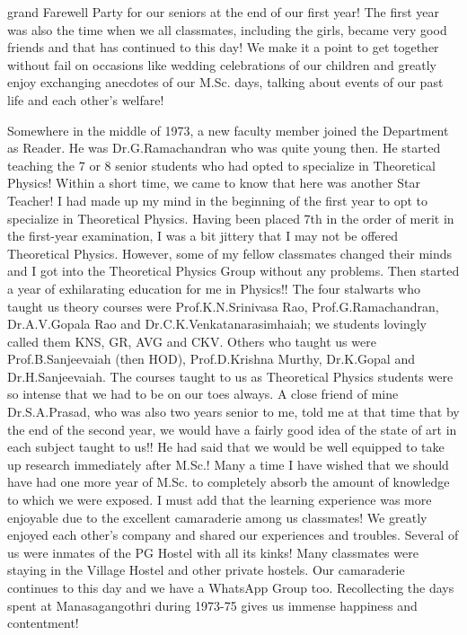 grand Farewell Party for our seniors at the end of our first year! The first year was also the time when we all classmates, including the girls, became very good friends and that has continued to this day! We make it a point to get together without fail on occasions like wedding celebrations of our children and greatly enjoy exchanging anecdotes of our M.Sc. days, talking about events of our past life and each other's welfare!

Somewhere in the middle of 1973, a new faculty member joined the Department as Reader. He was Dr.G.Ramachandran who was quite young then. He started teaching the 7 or 8 senior students who had opted to specialize in Theoretical Physics! Within a short time, we came to know that here was another Star Teacher! I had made up my mind in the beginning of the first year to opt to specialize in Theoretical Physics. Having been placed 7th in the order of merit in the first-year examination, I was a bit jittery that I may not be offered Theoretical Physics. However, some of my fellow classmates changed their minds and I got into the Theoretical Physics Group without any problems. Then started a year of exhilarating education for me in Physics!! The four stalwarts who taught us theory courses were Prof.K.N.Srinivasa Rao, Prof.G.Ramachandran, Dr.A.V.Gopala Rao and Dr.C.K.Venkatanarasimhaiah; we students lovingly called them KNS, GR, AVG and CKV. Others who taught us were Prof.B.Sanjeevaiah (then HOD), Prof.D.Krishna Murthy, Dr.K.Gopal and Dr.H.Sanjeevaiah. The courses taught to us as Theoretical Physics students were so intense that we had to be on our toes always. A close friend of mine Dr.S.A.Prasad, who was also two years senior to me, told me at that time that by the end of the second year, we would have a fairly good idea of the state of art in each subject taught to us!! He had said that we would be well equipped to take up research immediately after M.Sc.! Many a time I have wished that we should have had one more year of M.Sc. to completely absorb the amount of knowledge to which we were exposed. I must add that the learning experience was more enjoyable due to the excellent camaraderie among us classmates! We greatly enjoyed each other's company and shared our experiences and troubles. Several of us were inmates of the PG Hostel with all its kinks! Many classmates were staying in the Village Hostel and other private hostels. Our camaraderie continues to this day and we have a WhatsApp Group too. Recollecting the days spent at Manasagangothri during 1973-75 gives us immense happiness and contentment!


